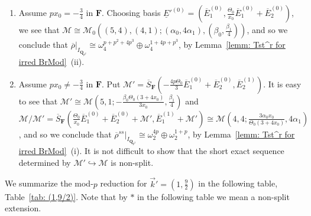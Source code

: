 \documentclass[11pt]{amsart}
\theoremstyle{definition}
\numberwithin{equation}{subsection}
\theoremstyle{plain}
\theoremstyle{plain}
\theoremstyle{plain}
\theoremstyle{plain}
\theoremstyle{plain}
\theoremstyle{plain}
\theoremstyle{plain}
\theoremstyle{plain}
\theoremstyle{plain}
\theoremstyle{plain}
\theoremstyle{plain}
\theoremstyle{plain}
\theoremstyle{definition}
\theoremstyle{definition}
\theoremstyle{definition}
\theoremstyle{remark}
\renewcommand{\(}{\textup{(}}
\renewcommand{\)}{\textup{)}}
\newcommand{\Q}{\mathbf{Q}}
\newcommand{\F}{\mathbf{F}}
\newcommand{\barS}{\overline{S}}
\newcommand{\rhobar}{\overline{\rho}}
\newcommand{\cM}{\mathcal{M}}
\newcommand{\barE}{\overline{E}}
\newcommand{\vk}{\vec{k}}
\newcommand{\IQptwo}{{I_{\Q_{p^2}}}}
\newcommand{\baseE}{\underline{E}}
\begin{document}
\begin{enumerate}[leftmargin=*]
      \begin{enumerate}[leftmargin=*]
        \item Assume $px_0=-\frac{3}{4}$ in $\F$. Choosing basis $\baseE'^{(0)}=(\barE_1^{(0)},\frac{\Theta_0}{x_0}\barE_1^{(0)}+\barE_2^{(0)})$, we see that $\cM\cong\cM_0((5,4),(4,1);(\alpha_0,4\alpha_1),(\beta_0,\frac{\beta_1}{4}))$, and so we conclude that $\rhobar|_\IQptwo\cong\omega_4^{p+p^2+4p^3}\oplus\omega_4^{1+4p+p^3}$, by Lemma~\ref{lemm: Tst^r for irred BrMod}~(ii).
        \item Assume $px_0\neq-\frac{3}{4}$ in $\F$. Put $\cM'=\barS_{\F}(-\frac{4p\Theta_0}{3}\barE_1^{(0)}+\barE_2^{(0)},\barE_2^{(1)})$. It is easy to see that $\cM'\cong\cM(5,1;-\frac{\beta_0\Theta_0(3+4x_0)}{3x_0},\frac{\beta_1}{4})$ and $\cM/\cM'=\barS_{\F}(\frac{\Theta_0}{x_0}\barE_1^{(0)}+\barE_2^{(0)}+\cM',\barE_1^{(1)}+\cM') \cong\cM(4,4;\frac{3\alpha_0x_0}{\Theta_0(3+4x_0)},4\alpha_1)$, and so we conclude that $\rhobar^{ss}|_\IQptwo\cong\omega_2^{4p}\oplus\omega_2^{1+p}$, by Lemma~\ref{lemm: Tst^r for irred BrMod}~(i). It is not difficult to show that the short exact sequence determined by $\cM'\hookrightarrow \cM$ is non-split.
      \end{enumerate}
\end{enumerate}
We summarize the mod-$p$ reduction for $\vk'=(1,\frac{9}{2})$ in the following table, Table~\ref{tab: (1,9/2)}. Note that by $\ast$ in the following table we mean a non-split extension.
\end{document}
